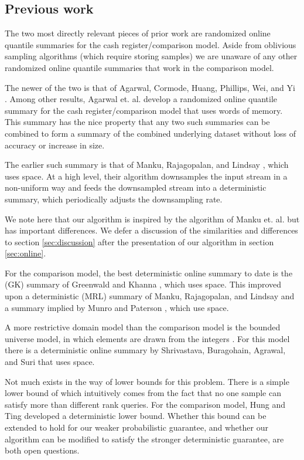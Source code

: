\documentclass{article}
\theoremstyle{plain}
\begin{document}
\subsection{Previous work}

The two most directly relevant pieces of prior work are randomized online
quantile summaries for the cash register/comparison model. Aside from oblivious
sampling algorithms (which require storing  samples) we are
unaware of any other randomized online quantile summaries that work in the
comparison model.

The newer of the two is that of Agarwal, Cormode, Huang, Phillips, Wei, and Yi
\cite{ACHPWY2012} \cite{ACHPWY2013}. Among other results, Agarwal et. al.
develop a randomized online quantile summary for the cash register/comparison
model that uses  words of memory.
This summary has the nice property that any two such summaries can be combined
to form a summary of the combined underlying dataset without loss of accuracy or
increase in size.

The earlier such summary is that of Manku, Rajagopalan, and Lindsay
\cite{MRL1999}, which uses  space. At a
high level, their algorithm downsamples the input stream in a non-uniform way
and feeds the downsampled stream into a deterministic summary, which
periodically adjusts the downsampling rate.

We note here that our algorithm is inspired by the algorithm of Manku et. al.
but has important differences. We defer a discussion of the similarities and
differences to section \ref{sec:discussion} after the presentation of our
algorithm in section \ref{sec:online}.

For the comparison model, the best deterministic online summary to date is the
(GK) summary of Greenwald and Khanna \cite{GK2001}, which uses
 space. This improved upon a deterministic (MRL)
summary of Manku, Rajagopalan, and Lindsay \cite{MRL1998} and a summary implied
by Munro and Paterson \cite{MP1978}, which use 
space.

A more restrictive domain model than the comparison model is the bounded
universe model, in which elements are drawn from the integers . For this model there is a deterministic online summary by Shrivastava,
Buragohain, Agrawal, and Suri \cite{SBAS2004} that uses  space.

Not much exists in the way of lower bounds for this problem. There is a simple
lower bound of  which intuitively comes from the fact that no one
sample can satisfy more than  different rank queries. For the
comparison model, Hung and Ting \cite{HT2010} developed a deterministic
 lower bound. Whether this bound can be
extended to hold for our weaker probabilistic guarantee, and whether our
algorithm can be modified to satisfy the stronger deterministic guarantee, are
both open questions.
\end{document}
